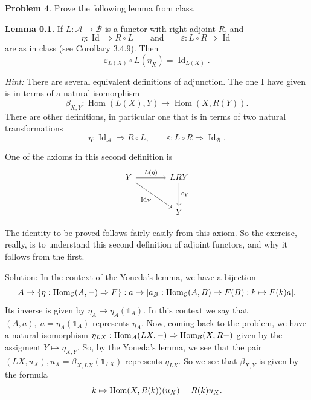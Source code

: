 \begin{dang}
    \textbf{Problem 4}.
Prove the following lemma from class.

\medskip

\noindent
\textbf{Lemma 0.1.}
If $L : \mathcal{A} \to \mathcal{B}$ is a functor with right adjoint
$R$, and
\[
\eta : \operatorname{Id} \Rightarrow R \circ L
\qquad\text{and}\qquad
\varepsilon : L \circ R \Rightarrow \operatorname{Id}
\]
are as in class (see Corollary 3.4.9). Then
\[
\varepsilon_{L(X)} \circ L(\eta_X) = \operatorname{Id}_{L(X)}.
\]

\medskip

\noindent
\textit{Hint:}
There are several equivalent definitions of adjunction. The one I have
given is in terms of a natural isomorphism
\[
\beta_{X,Y} :
\operatorname{Hom}(L(X),Y)
\longrightarrow
\operatorname{Hom}(X,R(Y)).
\]
There are other definitions, in particular one that is in terms of two
natural transformations
\[
\eta : \operatorname{Id}_{\mathcal A} \Rightarrow R \circ L,
\qquad
\varepsilon : L \circ R \Rightarrow \operatorname{Id}_{\mathcal B}.
\]

One of the axioms in this second definition is
\[
\begin{tikzcd}[column sep=large, row sep=large]
Y
    \arrow[r, "L(\eta)"]
    \arrow[dr, "\operatorname{Id}_Y"']
&
LRY
    \arrow[d, "\varepsilon_Y"]
\\
&
Y
\end{tikzcd}
\]

The identity to be proved follows fairly easily from this axiom. So the
exercise, really, is to understand this second definition of adjoint
functors, and why it follows from the first.
\end{dang}
Solution: In the context of the Yoneda's lemma, we have a bijection 
\begin{equation}
  A\to  \{\eta: \text{Hom}_{\mathcal{C}}(A,-)\Rightarrow F\}:a\mapsto [a_B: \text{Hom}_{\mathcal{C}}(A,B)\to F(B):k\mapsto F(k)a].
\end{equation}
Its inverse is given by $\eta_A\mapsto \eta_A(\mathds{1}_A)$. In this context we say that 
$(A,a),\;a=\eta_A(\mathds{1}_A)$ represents $\eta_A$. Now, coming back to the problem, we have a 
natural isomorphism $\eta_{LX}:\text{Hom}_{\mathcal{A}}(LX,-)\Rightarrow\text{Hom}_{\mathcal{B}}(X,R-)$ given by the assigment 
$Y\mapsto \eta_{X,Y}$. So, by the Yoneda's lemma, we see that the pair 
$(LX, u_X),u_X=\beta_{X,LX}(\mathds{1}_{LX})$ represents $\eta_{LX}$. So we see that $\beta_{X,Y}$ is given by the formula 
\begin{equation}
    k\mapsto \text{Hom}(X,R(k))(u_X)= R(k)u_X.
\end{equation}
